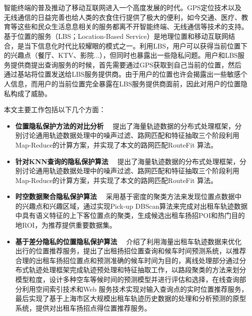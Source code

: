 \vspace{-2.5cm}
\chapter*{}
\vspace{-1cm}
智能终端的普及推动了移动互联网进入一个高度发展的时代。GPS定位技术以及无线通信的日益完善也给人类的衣食住行提供了极大的便利，如今交通、医疗、教育等这些和民众生活息息相关的服务都离不开智能终端、无线通信等技术的支持。基于位置的服务（LBS；Location-Based Service）是地理位置和移动互联网结合，是当下信息化时代比较耀眼的模式之一。利用LBS，用户可以获得当前位置下的兴趣点（餐厅、KTV、影院...），但同时也暴露出一些隐私问题。用户和LBS服务提供商提出查询服务的时候，首先需要通过GPS获取到自己当前的位置，然后通过基站将位置发送给LBS服务提供商。由于用户的位置也许会揭露出一些敏感个人信息，而用户的当前位置完全暴露在LBS服务提供商面前，因此对用户的位置隐私构成了威胁。

本文主要工作包括以下几个方面：
\begin{itemize}
  \item \textbf{位置隐私保护方法的对比分析} ~~提出了海量轨迹数据的分布式处理框架，分别讨论通用轨迹数据处理中的噪声过滤、路网匹配和特征抽取三个阶段利用Map-Reduce的计算方案，并实现了本文的路网匹配RouteFit 算法。
  \item \textbf{针对KNN查询的隐私保护算法} ~~提出了海量轨迹数据的分布式处理框架，分别讨论通用轨迹数据处理中的噪声过滤、路网匹配和特征抽取三个阶段利用Map-Reduce的计算方案，并实现了本文的路网匹配RouteFit 算法。
  \item \textbf{时空数据聚合隐私保护算法} ~~采用基于密度的聚类方法来发现位置点数据中的兴趣点和兴趣区域，通过实现Pick-up DBScan算法来完成对出租车轨迹数据中具有语义特征的上下客位置点的聚类，生成候选出租车扬招POI和热门目的地ROI，为推荐提供重要数据集。
  \item \textbf{基于差分隐私的位置隐私保护算法} ~~介绍了利用海量出租车轨迹数据来优化出行的位置推荐服务，提出了出租扬招位置查询和候车时间预测系统，以推荐合理的出租车扬招位置点和预测准确的候车时间为目的，离线处理部分通过分布式轨迹处理框架完成轨迹预处理和特征抽取工作，以路段聚类的方法来划分模型粒度，设计多种空车等候时间的预测模型并进行评估和选择，在线查询部分利用空间索引技术和Web 服务技术实现对输入查询点的实时位置推荐服务，最后实现了基于上海市区大规模出租车轨迹历史数据的处理和分析预测的原型系统，提供对出租车扬招点得位置推荐服务。
\end{itemize}
\hspace{-0.5cm}
 
